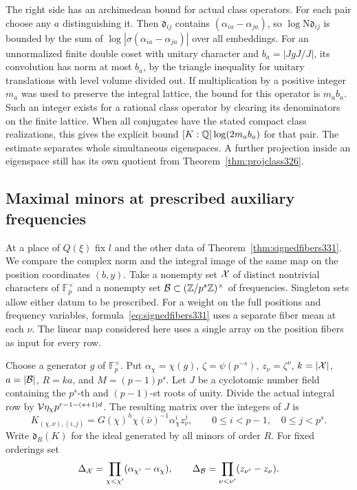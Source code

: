 \documentclass[a4paper,11pt]{article}
\theoremstyle{definition}
\theoremstyle{remark}
\newcommand{\ZZ}{\mathbb Z}\newcommand{\ord}{\operatorname{ord}}
\numberwithin{equation}{section}
\begin{document}
The right side has an archimedean bound for actual class
operators. For each pair choose any \(a\) distinguishing
it. Then \(\mathfrak d_{ij}\) contains
\((\alpha_{ia}-\alpha_{ja})\), so
\(\log\mathrm N\mathfrak d_{ij}\) is bounded by the
sum of \(\log|\sigma(\alpha_{ia}-\alpha_{ja})|\) over all
embeddings. For an unnormalized finite double coset with
unitary character and \(b_a=|JgJ/J|\), its convolution
has norm at most \(b_a\), by the triangle inequality for
unitary translations with level volume divided out. If
multiplication by a positive integer \(m_a\) was used to
preserve the integral lattice, the bound for this operator
is \(m_a b_a\). Such an integer exists for a rational
class operator by clearing its denominators on the finite
lattice. When all conjugates have the stated compact class
realizations, this gives the explicit bound
\([K:\mathbb Q]\log(2m_a b_a)\) for that pair. The estimate
separates whole simultaneous eigenspaces. A further
projection inside an eigenspace still has its own quotient
from Theorem~\ref{thm:projclass326}.

\subsection{Maximal minors at prescribed auxiliary frequencies}\label{sec:periodvolume331}
At a place of \(Q(\xi)\) fix \(l\) and the other data of
Theorem~\ref{thm:signedfibers331}. We compare the complex norm and
the integral image of the same map on the position coordinates
\((b,y)\). Take a nonempty set \({\cal X}\) of distinct nontrivial
characters of \(\mathbb F_p^\times\) and a nonempty set
\({\cal B}\subset(\ZZ/p^s\ZZ)^\times\) of frequencies. Singleton
sets allow either datum to be prescribed. For a weight on the full
positions and frequency variables, formula~\eqref{eq:signedfibers331}
uses a separate fiber mean at each \(\nu\). The linear map considered
here uses a single array on the position fibers as input for every
row.

Choose a generator \(g\) of \(\mathbb F_p^\times\). Put
\(\alpha_\chi=\chi(g)\), \(\zeta=\psi(p^{-s})\), \(z_\nu=\zeta^\nu\),
\(k=|{\cal X}|\), \(a=|{\cal B}|\), \(R=ka\), and \(M=(p-1)p^s\).
Let \(J\) be a cyclotomic number field containing the \(p^s\)-th
and \((p-1)\)-st roots of unity. Divide the actual integral row
by \({\cal V}\eta_\chi p^{r-1-(s+1)d}\). The resulting matrix
over the integers of \(J\) is
\[
 K_{(\chi,\nu),(i,j)}
 =G(\chi)^h\chi(\bar\nu)^{-1}\alpha_\chi^i z_\nu^j,
 \qquad 0\le i<p-1,\quad 0\le j<p^s .
\]
Write \(\mathfrak d_R(K)\) for the ideal generated by all minors
of order \(R\). For fixed orderings set
\[
 \Delta_{\cal X}=\prod_{\chi<\chi'}(\alpha_{\chi'}-\alpha_\chi),
 \qquad
 \Delta_{\cal B}=\prod_{\nu<\nu'}(z_{\nu'}-z_\nu).
\]
\end{document}

